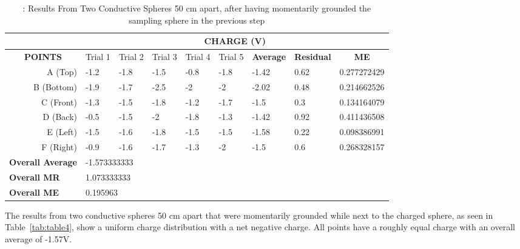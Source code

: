 \begin{table}[h]
    \caption{\label{tab:table 4}: Results From Two Conductive Spheres 50 cm apart, after having momentarily grounded the sampling sphere in the previous step}
    \begin{tabular}{@{}rllllllll@{}}
    \toprule
    \multicolumn{1}{l}{}                         & \multicolumn{8}{c}{\textbf{CHARGE (V)}}                       \\ \midrule
    \multicolumn{1}{c}{\textbf{POINTS}} &
      \multicolumn{1}{c}{Trial 1} &
      \multicolumn{1}{c}{Trial 2} &
      \multicolumn{1}{c}{Trial 3} &
      \multicolumn{1}{c}{Trial 4} &
      \multicolumn{1}{c}{Trial 5} &
      \multicolumn{1}{c}{\textbf{Average}} &
      \multicolumn{1}{c}{\textbf{Residual}} &
      \multicolumn{1}{c}{\textbf{ME}} \\
    A (Top)                                      & -1.2 & -1.8 & -1.5 & -0.8 & -1.8 & -1.42 & 0.62 & 0.277272429 \\
    B (Bottom)                                   & -1.9 & -1.7 & -2.5 & -2   & -2   & -2.02 & 0.48 & 0.214662526 \\
    C (Front)                                    & -1.3 & -1.5 & -1.8 & -1.2 & -1.7 & -1.5  & 0.3  & 0.134164079 \\
    D (Back)                                     & -0.5 & -1.5 & -2   & -1.8 & -1.3 & -1.42 & 0.92 & 0.411436508 \\
    E (Left)                                     & -1.5 & -1.6 & -1.8 & -1.5 & -1.5 & -1.58 & 0.22 & 0.098386991 \\
    F (Right)                                    & -0.9 & -1.6 & -1.7 & -1.3 & -2   & -1.5  & 0.6  & 0.268328157 \\
    \multicolumn{1}{l}{\textbf{Overall Average}} & \multicolumn{7}{l}{-1.573333333}                &             \\
    \multicolumn{1}{l}{\textbf{Overall MR}}      & \multicolumn{7}{l}{1.073333333}                 &             \\
    \multicolumn{1}{l}{\textbf{Overall ME}}      & \multicolumn{7}{l}{0.195963}                    &             \\ \bottomrule
    \end{tabular}
\end{table}
    
The results from two conductive spheres 50 cm apart that were momentarily grounded while next to the charged sphere, as seen in Table~\ref{tab:table4}, show a uniform charge distribution with a net negative charge. All points have a roughly equal charge with an overall average of  -1.57V.

